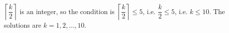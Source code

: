 $\left\lceil\dfrac k2\right\rceil$ is an integer, so the condition is $\left\lceil\dfrac k2\right\rceil\le5$, i.e. $\dfrac k2\le5$, i.e. $k\le10$. The solutions are $\boxed{k=1,2,\dots,10}$.
